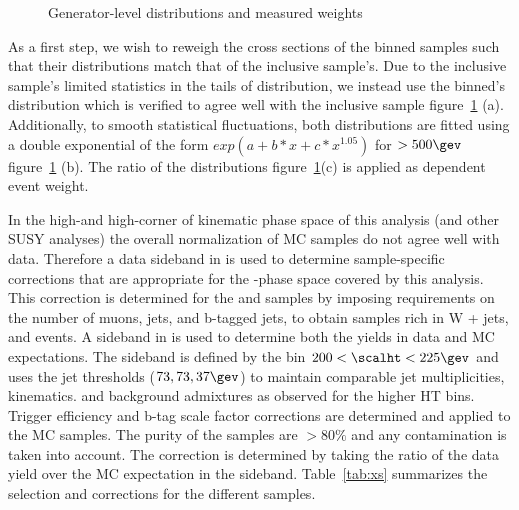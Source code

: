 \begin{figure}[h!t]
\begin{center}
    \caption{Generator-level \partonht distributions and measured weights}
    \label{fig:xsec_study}
  \end{center}
\end{figure}


As a first step, we wish to reweigh the cross sections of the \partonht binned samples such that
their \partonht distributions match that of the inclusive sample's. Due to
the inclusive sample's limited statistics in the tails of \scalht distribution, 
we instead use the \nparton binned's \partonht distribution which is verified to agree well 
with the inclusive sample figure~\ref{fig:xsec_study} (a).  Additionally, to smooth statistical
fluctuations, both distributions are fitted using a double exponential of the form $exp(a+b*x + c*x^{1.05})$
for \scalht $> 500\gev$ figure~\ref{fig:xsec_study} (b). The ratio of the distributions figure~\ref{fig:xsec_study}(c) 
is applied as \partonht dependent event weight.

In the high-\scalht and high-\met corner of kinematic phase space of this analysis 
(and other SUSY analyses) the overall normalization of MC samples do not 
agree well with data. Therefore a data sideband in \scalht is used
to determine sample-specific corrections that are appropriate for the
\scalht-\met phase space covered by this analysis. This correction is determined 
for the \wlnu and \ttbar samples by imposing requirements on the number of muons, 
jets, and b-tagged jets, to obtain samples rich in W + jets, and \ttbar events.
A sideband in \scalht is used to determine both the yields in data and
MC expectations. The sideband is defined by the bin $200 < \scalht
< 225\gev$ and uses the jet \pt thresholds ($73,73,37\gev$) to maintain 
comparable jet multiplicities, kinematics. and background admixtures as observed for the
higher HT bins. Trigger efficiency and b-tag scale factor corrections 
are determined and applied to the MC samples. The purity of the samples are $>80\%$ and
any contamination is taken into account. The correction is determined by 
taking the ratio of the data yield over the MC expectation in the sideband. 
Table~\ref{tab:xs} summarizes the selection and corrections for the different samples. 

